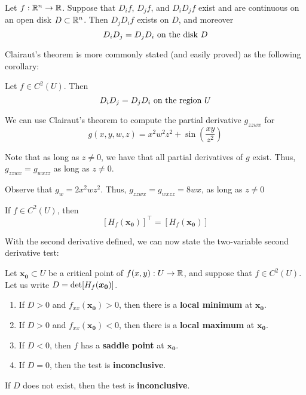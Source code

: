 \begin{theorem}
    
    Let $f: \mathbb{R}^n \to \mathbb{R}$.  Suppose that $D_if$, $D_jf$, and $D_iD_jf$ exist and are continuous on an open disk $D \subset \mathbb{R}^n$.  Then $D_jD_if$ exists on $D$, and moreover
    $$D_iD_j = D_jD_i\ \textnormal{on the disk} \ D$$
    
    \end{theorem}

    Clairaut's theorem is more commonly stated (and easily proved) as the following corollary:
    
    \begin{corollary}\label{clairautcorollary}
       Let $f \in C^2(U)$.  Then  $$D_iD_j = D_jD_i\ \textnormal{on the region} \ U$$
    \end{corollary}

\begin{example}
    We can use Clairaut's theorem to compute the partial derivative $g_{zzwx}$ for $$g(x,y,w,z) = x^2w^2z^2 + \sin\left(\frac{xy}{z^2}\right)$$

    Note that as long as $z \neq 0$, we have that all partial derivatives of $g$ exist. Thus, $g_{zzwx} = g_{wxzz}$ as long as $z \neq 0$.  
    
    Observe that $g_w = 2x^2wz^2$.  Thus, $g_{zzwx} = g_{wxzz} = 8wx$, as long as $z\neq 0$
\end{example}

\begin{corollary}
    If $f \in C^2(U)$, then $$\left[H_f(\bm{x_0})\right]^\intercal = \left[H_f(\bm{x_0})\right]$$
\end{corollary}

With the second derivative defined, we can now state the two-variable second derivative test:

\begin{theorem}

Let $\bm{x_0} \subset U$ be a critical point of $f(x,y) : U \to \mathbb{R}$, and suppose that $f \in C^2(U)$.  Let us write $D = \textnormal{det}[H_f(\bm{x_0})]$.

\begin{enumerate}
    \item If $D > 0$ and $f_{xx}(\bm{x_0}) > 0$, then there is a \textbf{local minimum} at $\bm{x_0}$.
    \item If $D > 0$ and $f_{xx}(\bm{x_0}) < 0$, then there is a \textbf{local maximum} at $\bm{x_0}$. 
    \item If $D < 0$, then $f$ has a \textbf{saddle point} at $\bm{x_0}$. 
    \item If $D = 0$, then the test is \textbf{inconclusive}. 
\end{enumerate}

If $D$ does not exist, then the test is \textbf{inconclusive}.
\end{theorem}

